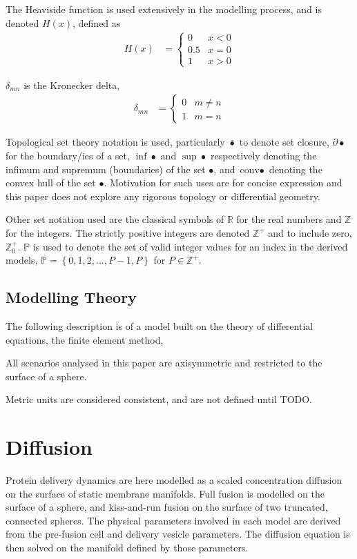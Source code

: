 \documentclass{report}
\newcommand\Brace[1]{{ \left\{{#1}\right\} }}
\newcommand\bbP{{ \mathbb{P} }}
\newcommand\bbR{{ \mathbb{R} }}
\newcommand\bbZ{{ \mathbb{Z} }}
\newcommand\conv{{ \text{conv} }}
\begin{document}
The Heaviside function is used extensively in the modelling process, and is denoted $H(x)$, defined as
\begin{align*}
	H(x) &= \begin{cases}
		0 & x < 0 \\
		0.5 & x = 0 \\
		1 & x > 0
	\end{cases}
\end{align*}

$\delta_{mn}$ is the Kronecker delta,
\begin{align*}
	\delta_{mn} &= \begin{cases}
		0 & m \neq n \\
		1 & m = n
	\end{cases}
\end{align*}

Topological set theory notation is used, particularly $\overline\bullet$ to denote set closure, $\partial\bullet$ for the boundary/ies of a set, $\inf\bullet$ and $\sup\bullet$ respectively denoting the infimum and supremum (boundaries) of the set $\bullet$, and $\conv\bullet$ denoting the convex hull of the set $\bullet$. Motivation for such uses are for concise expression and this paper does not explore any rigorous topology or differential geometry.

Other set notation used are the classical symbols of $\bbR$ for the real numbers and $\bbZ$ for the integers. The strictly positive integers are denoted $\bbZ^+$ and to include zero, $\bbZ_0^+$. $\bbP$ is used to denote the set of valid integer values for an index in the derived models, $\bbP = \Brace{0, 1, 2, ..., P-1, P}$ for $P \in \bbZ^+$.

\section{Modelling Theory}
The following description is of a model built on the theory of differential equations, the finite element method, 

All scenarios analysed in this paper are axisymmetric and restricted to the surface of a sphere.

Metric units are considered consistent, and are not defined until TODO.

\chapter{Diffusion}
Protein delivery dynamics are here modelled as a scaled concentration diffusion on the surface of static membrane manifolds. Full fusion is modelled on the surface of a sphere, and kiss-and-run fusion on the surface of two truncated, connected spheres. The physical parameters involved in each model are derived from the pre-fusion cell and delivery vesicle parameters. The diffusion equation is then solved on the manifold defined by those parameters.
\end{document}
